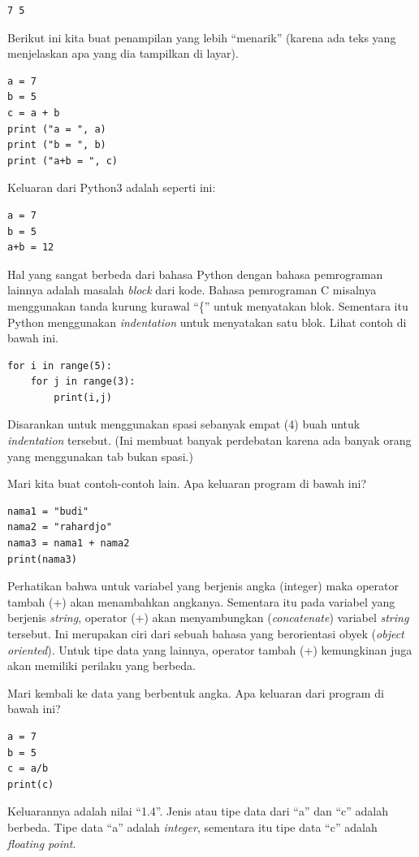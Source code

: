 \begin{verbatim}
7 5
\end{verbatim}

Berikut ini kita buat penampilan yang lebih ``menarik'' (karena ada teks yang
menjelaskan apa yang dia tampilkan di layar).
\begin{verbatim}
a = 7
b = 5
c = a + b
print ("a = ", a)
print ("b = ", b)
print ("a+b = ", c)
\end{verbatim}

Keluaran dari Python3 adalah seperti ini:
\begin{verbatim}
a = 7
b = 5
a+b = 12
\end{verbatim}

Hal yang sangat berbeda dari bahasa Python dengan
bahasa pemrograman lainnya adalah masalah {\em block} dari kode. 
Bahasa pemrograman C misalnya menggunakan tanda kurung kurawal ``\{'' 
untuk menyatakan blok. Sementara itu Python menggunakan {\em indentation} 
untuk menyatakan satu blok. Lihat contoh di bawah ini.

\begin{verbatim}
for i in range(5):
    for j in range(3):
        print(i,j)
\end{verbatim}

Disarankan untuk menggunakan spasi sebanyak empat (4) buah untuk {\em
indentation} tersebut. (Ini membuat banyak perdebatan karena ada banyak orang
yang menggunakan tab bukan spasi.)

Mari kita buat contoh-contoh lain. Apa keluaran program di bawah ini?
\begin{verbatim}
nama1 = "budi"
nama2 = "rahardjo"
nama3 = nama1 + nama2
print(nama3)
\end{verbatim}

Perhatikan bahwa untuk variabel yang berjenis angka (integer) maka operator 
tambah (+) akan menambahkan angkanya. Sementara itu pada variabel yang
berjenis {\em string}, operator (+) akan menyambungkan ({\em concatenate})
variabel {\em string} tersebut.
Ini merupakan ciri dari sebuah bahasa yang berorientasi obyek
({\em object oriented}).
Untuk tipe data yang lainnya, operator tambah (+) kemungkinan juga akan
memiliki perilaku yang berbeda.

Mari kembali ke data yang berbentuk angka. Apa keluaran dari program
di bawah ini?
\begin{verbatim}
a = 7
b = 5
c = a/b
print(c)
\end{verbatim}

Keluarannya adalah nilai ``1.4''. Jenis atau tipe data dari ``a'' dan ``c''
adalah berbeda. Tipe data ``a'' adalah {\em integer}, sementara itu
tipe data ``c'' adalah {\em floating point}.

